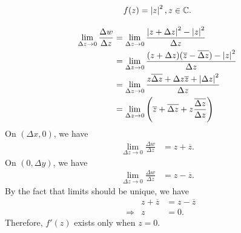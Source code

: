 \documentclass[12pt]{book}
\begin{document}
\begin{exmp}
    $$
        f(z) = \left\lvert z \right\rvert^2, z \in \mathbb{C}.
    $$
\end{exmp}
\begin{align*}
    \lim_{\Delta z \rightarrow 0} \frac{\Delta w}{\Delta z}
        &= 
            \lim_{\Delta z \rightarrow 0} \frac{\left\lvert z + \Delta z \right\rvert^{2} - \left\lvert z \right\rvert^2}{\Delta z} \\
        &=
            \lim_{\Delta z \rightarrow 0} \frac{(z + \Delta z)(\overline{z} - \overline{\Delta z}) - \left\lvert z \right\rvert^{2}}{\Delta z} \\
        &=
            \lim_{\Delta z \rightarrow 0} \frac{z\overline{\Delta z} + \Delta z \overline{z} + \left\lvert \Delta z \right\rvert^{2}}{\Delta z} \\
        &=
            \lim_{\Delta z \rightarrow 0} \left(\overline{z} + \overline{\Delta z}  + z \frac{\overline{\Delta z}}{\Delta z}\right)
\end{align*}
On $(\Delta x, 0)$, we have 
\begin{align*}
    \lim_{\Delta z \rightarrow 0} \frac{\Delta w}{\Delta z}
        &= 
            z + \overline{z}.
\end{align*}
On $(0, \Delta y)$, we have 
\begin{align*}
    \lim_{\Delta z \rightarrow 0} \frac{\Delta w}{\Delta z}
        &= 
            z - \overline{z}.
\end{align*}
By the fact that limits should be unique, we have 
\begin{align*}
    &&z + \overline{z} 
        &= 
            z - \overline{z} \\
    &\Rightarrow &z
        &= 0.
\end{align*}
Therefore, $f'(z)$ exists only when $z = 0.$
\end{document}

